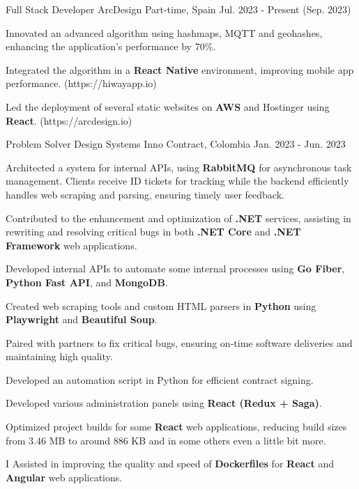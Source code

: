 \begin{cventries}
  \cventry
  {Full Stack Developer} %
  {ArcDesign} %
  {Part-time, Spain} %
  {Jul. 2023 - Present (Sep. 2023)} %
  {
    \begin{cvitems} %
      \item {Innovated an advanced algorithm using hashmaps, MQTT and geohashes, enhancing the application's performance by 70\%.}
      \item {Integrated the algorithm in a \textbf{React Native} environment, improving mobile app performance. (https://hiwayapp.io)}
      \item {Led the deployment of several static websites on \textbf{AWS} and Hostinger using \textbf{React}. (https://arcdesign.io)}
    \end{cvitems}
  }
  \cventry
  {Problem Solver} %
  {Design Systems Inno} %
  {Contract, Colombia} %
  {Jan. 2023 - Jun. 2023} %
  {
    \begin{cvitems} %
      \item {Architected a system for internal APIs, using \textbf{RabbitMQ} for asynchronous task management. Clients receive ID tickets for tracking while the backend efficiently handles web scraping and parsing, ensuring timely user feedback.}
      \item {Contributed to the enhancement and optimization of \textbf{.NET} services, assisting in rewriting and resolving critical bugs in both \textbf{.NET Core} and \textbf{.NET Framework} web applications.}
      \item {Developed internal APIs to automate some internal processes using \textbf{Go Fiber}, \textbf{Python Fast API}, and \textbf{MongoDB}.}
      \item {Created web scraping tools and custom HTML parsers in \textbf{Python} using \textbf{Playwright} and \textbf{Beautiful Soup}.}
      \item {Paired with partners to fix critical bugs, ensuring on-time software deliveries and maintaining high quality.}
      \item {Developed an automation script in Python for efficient contract signing.}
      \item {Developed various administration panels using \textbf{React (Redux + Saga)}.}
      \item {Optimized project builds for some \textbf{React} web applications, reducing build sizes from 3.46 MB to around 886 KB and in some others even a little bit more.}
      \item {I Assisted in improving the quality and speed of \textbf{Dockerfiles} for \textbf{React} and \textbf{Angular} web applications.}
    \end{cvitems}
  }


\end{cventries}
